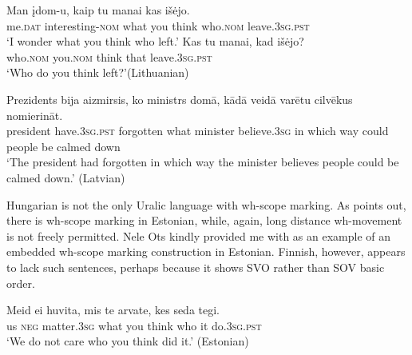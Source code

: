 \documentclass[output=paper,colorlinks,citecolor=brown]{langscibook}
\begin{document}
\begin{otherlanguage}{english}
\largerpage[2]
\ea\label{ex:fanselow:26}
\ea
\gll Man	įdom-u, 	kaip  	tu  	manai  	kas  	išėjo. \\
    me.\textsc{dat} interesting-\textsc{nom} what 	you think who.\textsc{nom} leave.3\textsc{sg}.\textsc{pst} \\
\glt ‘I wonder what you think who left.'
\label{ex:fanselow:26a}
\label{ex:fanselow:26b}
\ex
\gll       Kas  	tu  	manai,  	kad 	išėjo? \\
        who.\textsc{nom} you.\textsc{nom}  	think 	that 	leave.3\textsc{sg}.\textsc{pst} \\
\glt ‘Who do you think left?'\hfill (Lithuanian)
\label{ex:fanselow:26c}
\z

\ex\label{ex:fanselow:28}
\gll  Prezidents 	bija 	aizmirsis, 	ko 	ministrs 	domā, 	kādā 		veidā 	varētu  	
	cilvēkus 	nomierināt. \\
    president have.3\textsc{sg}.\textsc{pst} forgotten what minister believe.3\textsc{sg} {in which} way could people {be calmed down} \\
    \glt    ‘The president had forgotten in which way the minister believes people could be 	calmed down.' \hfill (Latvian)
\z\clearpage

\noindent Hungarian is not the only Uralic language with wh-scope marking. As \citet{Allkivi2018} points out, there is wh-scope marking in Estonian, while, again, long distance wh-movement is not freely permitted. Nele Ots kindly provided me with  as an example of an embedded wh-scope marking construction in Estonian. Finnish, however, appears to lack such sentences, perhaps because it shows SVO rather than SOV basic order.

\ea \label{ex:fanselow:29}
\gll  Meid 	ei 	huvita, 	mis 	te 	arvate, 	kes 		seda 	tegi. \\
    us \textsc{neg} matter.3\textsc{sg} what you think who it do.3\textsc{sg}.\textsc{pst} \\
    \glt    ‘We do not care who you think did it.' \hfill (Estonian)
    \z


\end{otherlanguage}
\end{document}
